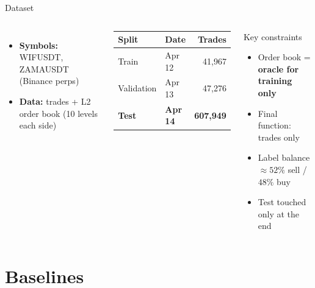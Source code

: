 \documentclass[aspectratio=169,10pt]{beamer}
\begin{document}
\begin{frame}{Dataset}
  \begin{columns}[T]
    \begin{itemize}
      \item \textbf{Symbols:} WIFUSDT, ZAMAUSDT (Binance perps)
      \item \textbf{Data:} trades + L2 order book (10 levels each side)
    \end{itemize}

    \medskip
    \begin{center}
    \begin{tabular}{llr}
      \toprule
      Split & Date & Trades \\
      \midrule
      Train      & Apr 12 &   41{,}967 \\
      Validation & Apr 13 &   47{,}276 \\
      \textbf{Test} & \textbf{Apr 14} & \textbf{607{,}949} \\
      \bottomrule
    \end{tabular}
    \end{center}

    \begin{block}{Key constraints}
      \begin{itemize}
        \item Order book = \textbf{oracle for training only}
        \item Final function: trades only
        \item Label balance $\approx 52\%$ sell / $48\%$ buy
        \item Test touched only at the end
      \end{itemize}
    \end{block}
  \end{columns}
\end{frame}

\section{Baselines}
\end{document}
